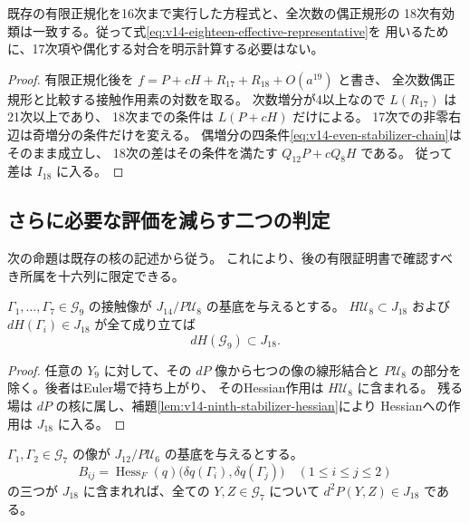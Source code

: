 \begin{corollary}[十七次の明示的な消去を省いてよい]
\label{cor:v14-eighteen-without-seventeenth}
既存の有限正規化を16次まで実行した方程式と、全次数の偶正規形の
18次有効類は一致する。従って式\eqref{eq:v14-eighteen-effective-representative}を
用いるために、17次項や偶化する対合を明示計算する必要はない。
\end{corollary}

\begin{proof}
有限正規化後を
$f=P+cH+R_{17}+R_{18}+O(a^{19})$ と書き、
全次数偶正規形と比較する接触作用素の対数を取る。
次数増分が4以上なので $L(R_{17})$ は21次以上であり、
18次までの条件は $L(P+cH)$ だけによる。
17次での非零右辺は奇増分の条件だけを変える。
偶増分の四条件\eqref{eq:v14-even-stabilizer-chain}はそのまま成立し、
18次の差はその条件を満たす $Q_{12}P+cQ_8H$ である。
従って差は $I_{18}$ に入る。
\end{proof}

\subsection{さらに必要な評価を減らす二つの判定}

次の命題は既存の核の記述から従う。
これにより、後の有限証明書で確認すべき所属を十六列に限定できる。

\begin{proposition}[全九次場のHessian作用を調べる有限基底]
\label{prop:v14-test-all-ninth-hessian}
$\Gamma_1,\ldots,\Gamma_7\in\mathcal G_9$ の接触像が
$J_{14}/P\mathcal U_8$ の基底を与えるとする。
$H\mathcal U_8\subset J_{18}$ および
$dH(\Gamma_i)\in J_{18}$ が全て成り立てば
\[
 dH(\mathcal G_9)\subset J_{18}.
\]
\end{proposition}

\begin{proof}
任意の $Y_9$ に対して、その $dP$ 像から七つの像の線形結合と
$P\mathcal U_8$ の部分を除く。後者はEuler場で持ち上がり、
そのHessian作用は $H\mathcal U_8$ に含まれる。
残る場は $dP$ の核に属し、補題\ref{lem:v14-ninth-stabilizer-hessian}により
Hessianへの作用は $J_{18}$ に入る。
\end{proof}

\begin{proposition}[七次場の二次補正を調べる三つの評価]
\label{prop:v14-test-seventh-quadratic}
$\Gamma_1,\Gamma_2\in\mathcal G_7$ の像が
$J_{12}/P\mathcal U_6$ の基底を与えるとする。
\[
 B_{ij}=\operatorname{Hess}_F(q)
             \bigl(\delta q(\Gamma_i),\delta q(\Gamma_j)\bigr)
 \quad(1\le i\le j\le2)
\]
の三つが $J_{18}$ に含まれれば、全ての $Y,Z\in\mathcal G_7$ について
$d^2P(Y,Z)\in J_{18}$ である。
\end{proposition}

